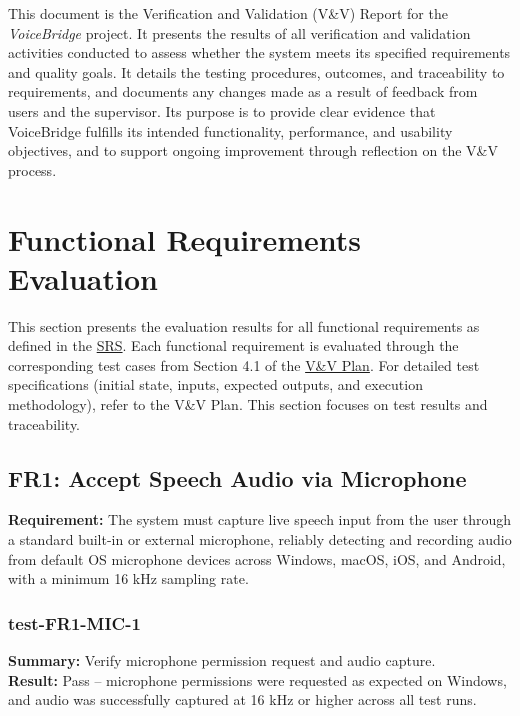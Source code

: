 \documentclass[12pt, titlepage]{article}
\begin{document}
\newpage

\tableofcontents

\listoftables %

\listoffigures %

\newpage


This document is the Verification and Validation (V\&V) Report for the \emph{VoiceBridge} project. It presents the results of all verification and validation activities conducted to assess whether the system meets its specified requirements and quality goals. It details the testing procedures, outcomes, and traceability to requirements, and documents any changes made as a result of feedback from users and the supervisor. Its purpose is to provide clear evidence that VoiceBridge fulfills its intended functionality, performance, and usability objectives, and to support ongoing improvement through reflection on the V\&V process.

\section{Functional Requirements Evaluation}

This section presents the evaluation results for all functional requirements as defined in the \href{../SRS-Volere/SRS.pdf}{SRS}. Each functional requirement is evaluated through the corresponding test cases from Section 4.1 of the \href{../VnVPlan/VnVPlan.pdf}{V\&V Plan}. For detailed test specifications (initial state, inputs, expected outputs, and execution methodology), refer to the V\&V Plan. This section focuses on test results and traceability.

\subsection{FR1: Accept Speech Audio via Microphone}

\textbf{Requirement:} The system must capture live speech input from the user through a standard built-in or external microphone, reliably detecting and recording audio from default OS microphone devices across Windows, macOS, iOS, and Android, with a minimum 16 kHz sampling rate.

\subsubsection{test-FR1-MIC-1}
\textbf{Summary:} Verify microphone permission request and audio capture.\\
\textbf{Result:} Pass -- microphone permissions were requested as expected on Windows, and audio was successfully captured at 16 kHz or higher across all test runs.
\end{document}
